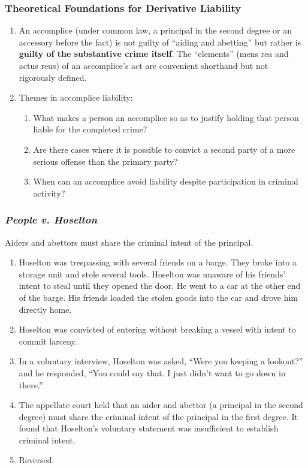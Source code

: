\subsubsection{Theoretical Foundations for Derivative Liability}

\begin{enumerate}
    \item An accomplice (under common law, a principal in the second degree or 
    an accessory before the fact) is not guilty of ``aiding and abetting'' but 
    rather is \textbf{guilty of the substantive crime itself}. The 
    ``elements'' (mens rea and actus reus) of an accomplice's act are 
    convenient shorthand but not rigorously defined.
    \item Themes in accomplice liability:
    \begin{enumerate}
        \item What makes a person an accomplice so as to justify holding that 
        person liable for the completed crime?
        \item Are there cases where it is possible to convict a second party of a 
        more serious offense than the primary party?
        \item When can an accomplice avoid liability despite participation in 
        criminal activity?
    \end{enumerate}
\end{enumerate}

\subsubsection{\emph{People v. Hoselton}}

Aiders and abettors must share the criminal intent of the principal.

\begin{enumerate}
    \item Hoselton was trespassing with several friends on a barge. They broke 
    into a storage unit and stole several tools. Hoselton was unaware of his 
    friends' intent to steal until they opened the door. He went to a car at 
    the other end of the barge. His friends loaded the stolen goods into the 
    car and drove him directly home.
    \item Hoselton was convicted of entering without breaking a vessel with 
    intent to commit larceny.
    \item In a voluntary interview, Hoselton was asked, ``Were you keeping a 
    lookout?'' and he responded, ``You could say that. I just didn't want to 
    go down in there.''
    \item The appellate court held that an aider and abettor (a principal in 
    the second degree) must share the criminal intent of the principal in the 
    first degree. It found that Hoselton's voluntary statement was 
    insufficient to establish criminal intent.
    \item Reversed.
\end{enumerate}

